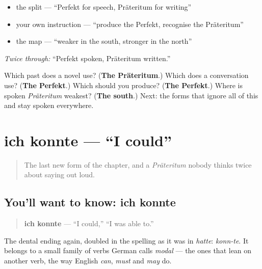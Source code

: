 \begin{itemize}
\raggedright
  \item the split — \textquotedblleft{}Perfekt for speech, Präteritum for writing\textquotedblright{}
  \item your own instruction — \textquotedblleft{}produce the Perfekt, recognise the Präteritum\textquotedblright{}
  \item the map — \textquotedblleft{}weaker in the south, stronger in the north\textquotedblright{}
\end{itemize}

\emph{Twice through:} \textquotedblleft{}Perfekt spoken, Präteritum written.\textquotedblright{}

\begin{tcolorbox}[breakable,colback=teal!4,colframe=teal!35!black,title={Before you move on}]
Which past does a novel use? (\textbf{The Präteritum}.) Which does a conversation use? (\textbf{The Perfekt}.) Which should you produce? (\textbf{The Perfekt}.) Where is spoken \emph{Präteritum} weakest? (\textbf{The south}.) Next: the forms that ignore all of this and stay spoken everywhere.
\end{tcolorbox}
\section[ich konnte]{ich konnte — \textquotedblleft{}I could\textquotedblright{}}

\label{lesson:GE-C15-konnte}



\begin{quote}
The last new form of the chapter, and a \emph{Präteritum} nobody thinks twice about saying out loud.
\end{quote}

\subsection*{You'll want to know: ich konnte}
\begin{quote}
\textbf{ich konnte} — \textquotedblleft{}I could,\textquotedblright{} \textquotedblleft{}I was able to.\textquotedblright{}
\end{quote}

The dental ending again, doubled in the spelling as it was in \emph{hatte}: \emph{konn-te}. It belongs to a small family of verbs German calls \emph{modal} — the ones that lean on another verb, the way English \emph{can}, \emph{must} and \emph{may} do.

